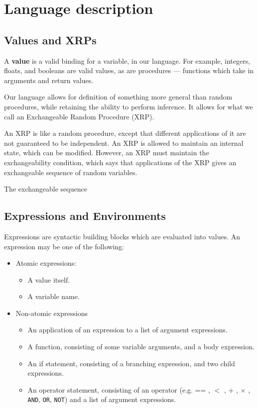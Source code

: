 \documentclass[11pt]{article}
\begin{document}
\section{Language description}

\subsection{Values and XRPs}

A {\bf value} is a valid binding for a variable, in our language.  For example, integers, floats, and booleans are valid values, as are procedures --- functions which take in arguments and return values.  

Our language allows for definition of something more general than random procedures, while retaining the ability to perform inference.   It allows for what we call an Exchangeable Random Procedure (XRP).  

An XRP is like a random procedure, except that different applications of it are not guaranteed to be independent.  An XRP is allowed to maintain an internal state, which can be modified.  However, an XRP must maintain the exchangeability condition, which says that applications of the XRP gives an exchangeable sequence of random variables.  

The exchangeable sequence 



\subsection{Expressions and Environments}

Expressions are syntactic building blocks which are evaluated into values.  An expression may be one of the following:
\begin{itemize}
\item Atomic expressions:
\begin{itemize}
\item A value itself.
\item A variable name.
\end{itemize}
\item Non-atomic expressions
\begin{itemize}
\item An application of an expression to a list of argument expressions.
\item A function, consisting of some variable arguments, and a body expression.
\item An if statement, consisting of a branching expression, and two child expressions.
\item An operator statement, consisting of an operator (e.g. == , $<$ , + , $\times$ , {\tt AND}, {\tt OR}, {\tt NOT}) and a list of argument expressions.
\end{itemize}
\end{itemize}
\end{document}
